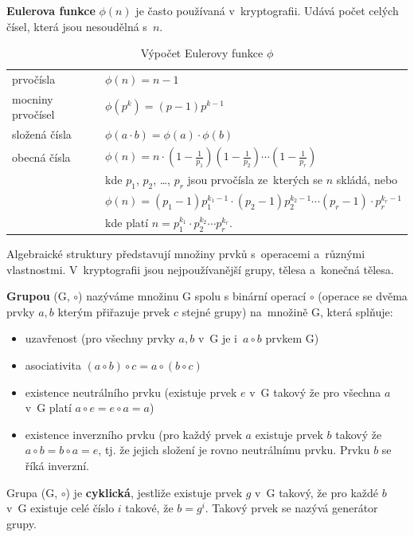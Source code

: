 \textbf{Eulerova funkce} $\phi(n)$ je často používaná v~kryptografii. Udává počet celých čísel, která jsou nesoudělná s~$n$.

\begin{table}[ht]
    \centering
    \caption{Výpočet Eulerovy funkce $\phi$}
    \begin{tabular}{l|l}
        prvočísla & $\phi(n) = n-1$ \\
        mocniny prvočísel & $\phi(p^k) = (p-1) p^{k-1}$ \\
        složená čísla & $\phi(a \cdot b) = \phi(a) \cdot \phi(b)$ \\
        obecná čísla & $\phi(n) = n \cdot (1 - \frac{1}{p_1}) (1 - \frac{1}{p_2}) \cdots (1 - \frac{1}{p_r})$ \\
        & kde $p_1$, $p_2$, \dots, $p_r$ jsou prvočísla ze~kterých se $n$ skládá, nebo \\
        & $\phi(n) = (p_1 -1) p_1^{k_1-1} \cdot (p_2 -1) p_2^{k_2-1} \cdots (p_r -1) \cdot p_r^{k_r-1}$ \\
        & kde platí $n = p_1^{k_1} \cdot p_2^{k_2} \cdots p_r^{k_r}$.
    \end{tabular}
\end{table}

Algebraické struktury představují množiny prvků s~operacemi a~různými vlastnostmi. V~kryptografii jsou nejpoužívanější grupy, tělesa a~konečná tělesa.

\textbf{Grupou} (G, $\circ$) nazýváme množinu G spolu s binární operací $\circ$ (operace se dvěma prvky $a, b$ kterým přiřazuje prvek $c$ stejné grupy) na~množině G, která splňuje:

\begin{itemize}[noitemsep]
    \item uzavřenost (pro všechny prvky $a, b$ v~G je i~$a \circ b$ prvkem G)
    \item asociativita $(a \circ b) \circ c = a \circ (b \circ c)$
    \item existence neutrálního prvku (existuje prvek $e$ v~G takový že pro všechna $a$ v~G platí $a \circ e = e \circ a = a$)
    \item existence inverzního prvku (pro každý prvek $a$ existuje prvek $b$ takový že $a \circ b = b \circ a = e$, tj. že jejich složení je rovno neutrálnímu prvku. Prvku $b$ se říká inverzní.
\end{itemize}

Grupa (G, $\circ$) je \textbf{cyklická}, jestliže existuje prvek $g$ v~G takový, že pro každé $b$ v~G existuje celé číslo $i$ takové, že $b = g^i$. Takový prvek se nazývá generátor grupy. 

